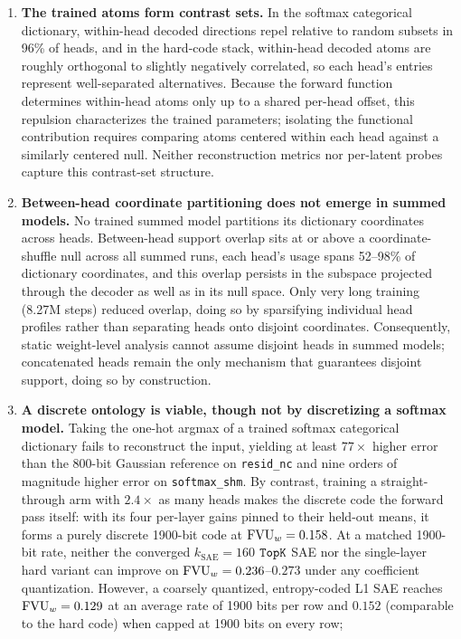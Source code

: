 \begin{enumerate}
\item \textbf{The trained atoms form contrast sets.} In the softmax
categorical dictionary, within-head decoded directions repel relative to
random subsets in 96\% of heads, and in the hard-code stack, within-head
decoded atoms are roughly orthogonal to slightly negatively correlated, so each
head's entries represent well-separated alternatives. Because the forward
function determines within-head atoms only up to a shared per-head
offset, this repulsion characterizes the trained parameters; isolating
the functional contribution requires comparing atoms centered within each
head against a similarly centered null. Neither reconstruction metrics
nor per-latent probes capture this contrast-set structure.
\item \textbf{Between-head coordinate partitioning does not emerge in
summed models.} No trained summed model partitions its dictionary
coordinates across heads. Between-head support overlap sits at or above a
coordinate-shuffle null across all summed runs, each head's usage spans
52--98\% of dictionary coordinates, and this overlap persists in the
subspace projected through the decoder as well as in its null space. Only
very long training (8.27M steps) reduced overlap, doing so by
sparsifying individual head profiles rather than separating heads onto
disjoint coordinates. Consequently, static weight-level analysis cannot
assume disjoint heads in summed models; concatenated heads remain the
only mechanism that guarantees disjoint support, doing so by
construction.
\item \textbf{A discrete ontology is viable, though not by discretizing a
softmax model.} Taking the one-hot argmax of a trained softmax
categorical dictionary fails to reconstruct the input, yielding at least
$77\times$ higher error than the 800-bit Gaussian reference on
\texttt{resid\_nc} and nine orders of magnitude higher error on
\texttt{softmax\_shm}. By contrast, training a straight-through arm with
$2.4\times$ as many heads makes the discrete code the forward pass
itself: with its four per-layer gains pinned to their held-out means, it
forms a purely discrete 1900-bit code at $\mathrm{FVU}_w = 0.158$. At a matched
1900-bit rate, neither the converged
$k_{\mathrm{SAE}}{=}160$ $\mathop{\mathtt{TopK}}\limits$ SAE nor the single-layer hard variant
can improve on $\mathrm{FVU}_w = 0.236$--$0.273$ under any coefficient
quantization. However, a coarsely quantized, entropy-coded L1 SAE reaches
$\mathrm{FVU}_w = 0.129$ at an average rate of 1900 bits per row and $0.152$
(comparable to the hard code) when capped at 1900 bits on every row;

\end{enumerate}
